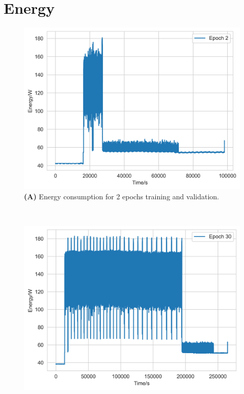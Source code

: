 \documentclass[utf8]{FrontiersinVancouver} %
\begin{document}
\section{Energy}

\begin{figure}[htb]

  \begin{center}
     \begin{minipage}[t]{0.30\textwidth}
        \includegraphics[width=1.0\linewidth]{images/card-name-v100-gpu-count-1-cpu-num-6-mem-32gb-repeat-1-tfttransformerepochs-2.png}
        {\bf (A)} Energy consumption for 2 epochs training and validation.
     \end{minipage}
     \ \
     \begin{minipage}[t]{0.30\textwidth}
        \includegraphics[width=1.0\linewidth]{images/card-name-v100-gpu-count-1-cpu-num-6-mem-32gb-repeat-1-tfttransformerepochs-30.png}

\end{minipage}
\end{center}
\end{figure}
\end{document}
